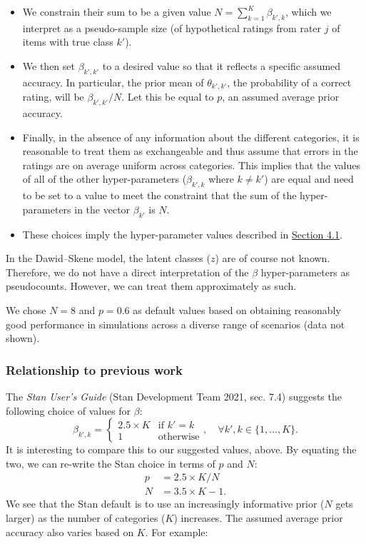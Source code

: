 \begin{itemize}
\item
  We constrain their sum to be a given value
  \(N = \sum_{k = 1}^K \beta_{k',  k}\), which we interpret as a pseudo-sample size (of hypothetical
  ratings from rater \(j\) of items with true class \(k'\)).
\item
  We then set \(\beta_{k', k'}\) to a desired value so that it reflects
  a specific assumed accuracy. In particular, the prior mean of
  \(\theta_{k',  k'}\), the probability of a correct rating, will be
  \(\beta_{k', k'} / N\). Let this be equal to \(p\), an assumed average
  prior accuracy.
\item
  Finally, in the absence of any information about the different
  categories, it is reasonable to treat them as exchangeable and thus
  assume that errors in the ratings are on average uniform across
  categories. This implies that the values of all of the other
  hyper-parameters (\(\beta_{k',  k}\) where \(k \neq k'\)) are equal and need to be set to a value
  to meet the constraint that the sum of the hyper-parameters in the
  vector \(\beta_{k'}\) is \(N\).
\item
  These choices imply the hyper-parameter values described in
  \protect\hyperlink{sec:dawid-skene}{Section 4.1}.
\end{itemize}

In the Dawid--Skene model, the latent classes (\(z\)) are of course not
known. Therefore, we do not have a direct interpretation of the \(\beta\)
hyper-parameters as pseudocounts. However, we can treat them
approximately as such.

We chose \(N = 8\) and \(p = 0.6\) as default values based on obtaining
reasonably good performance in simulations across a diverse range of
scenarios (data not shown).

\hypertarget{relationship-to-previous-work}{%
\subsubsection{Relationship to previous work}\label{relationship-to-previous-work}}

The \emph{Stan User's Guide} (Stan Development Team 2021, sec. 7.4) suggests the following choice of
values for \(\beta\):
\[
  \beta_{k', k} =
    \begin{cases}
      2.5 \times K & \textrm{if } k' = k \\
      1 & \textrm{otherwise}
    \end{cases},
  \quad \forall k', k \in \{1, \dots, K\}.
\]
It is interesting to compare this to our suggested values, above. By
equating the two, we can re-write the Stan choice in terms of \(p\) and
\(N\):
\[
\begin{aligned}
  p &= 2.5 \times K / N  \\
  N &= 3.5 \times K - 1.
\end{aligned}
\]
We see that the Stan default is to use an increasingly informative prior
(\(N\) gets larger) as the number of categories (\(K\)) increases. The
assumed average prior accuracy also varies based on \(K\). For example:

